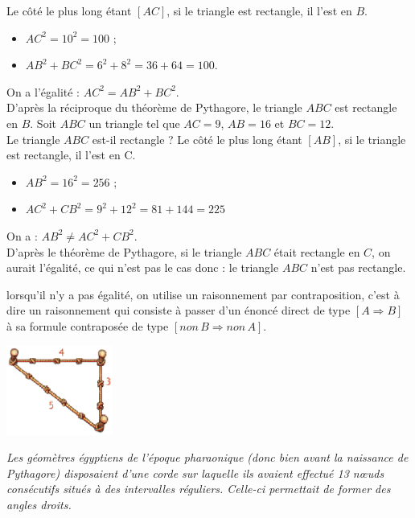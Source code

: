 \begin{methode*2*2}
\correction  
   Le côté le plus long étant $[AC]$, si le triangle est rectangle, il l'est en $B$.      
   \begin{itemize}
      \item $AC^2=10^2 =100$ ;
      \item $AB^2+BC^2 =6^2+8^2 =36+64 =100$.
   \end{itemize}      
   On a l'égalité : $AC^2= AB^2+ BC^2$. \\
   D'après la réciproque du théorème de Pythagore, le triangle $ABC$ est rectangle en $B$.
\exercice
   Soit $ABC$ un triangle tel que $AC=9$, $AB=16$ et $BC=12$. \\
   Le triangle $ABC$ est-il rectangle ?
\correction  
   Le côté le plus long étant $[AB]$, si le triangle est rectangle, il l'est en C.      
   \begin{itemize}
      \item $AB^2=16^2 =256$ ;
      \item $AC^2+CB^2 =9^2+12^2 =81+144 =225$
   \end{itemize}      
   On a : $AB^2 \neq AC^2+ CB^2$. \\
   D'après le théorème de Pythagore, si le triangle $ABC$ était rectangle en $C$, on aurait l'égalité, ce qui n'est pas le cas donc : le triangle $ABC$ n'est pas rectangle.
\end{methode*2*2}

\begin{remarque}
   lorsqu'il n'y a pas égalité, on utilise un raisonnement par contraposition, c'est à dire un raisonnement qui consiste à passer d'un énoncé direct de type $[A\Longrightarrow B]$ à sa formule contraposée de type $[non\,B\Longrightarrow non\,A]$.  
\end{remarque}

\hspace*{0.5cm}
\begin{minipage}{4cm}
   \includegraphics[width=3.5cm]{Geometrie/Images/G10_cours_corde}
\end{minipage}
\begin{minipage}{12cm}
  {\it Les géomètres égyptiens de l'époque pharaonique (donc bien avant la naissance de Pythagore) disposaient d'une corde sur laquelle ils avaient effectué 13 n\oe uds consécutifs situés à des intervalles réguliers. Celle-ci permettait de former des angles droits.}
\end{minipage}


